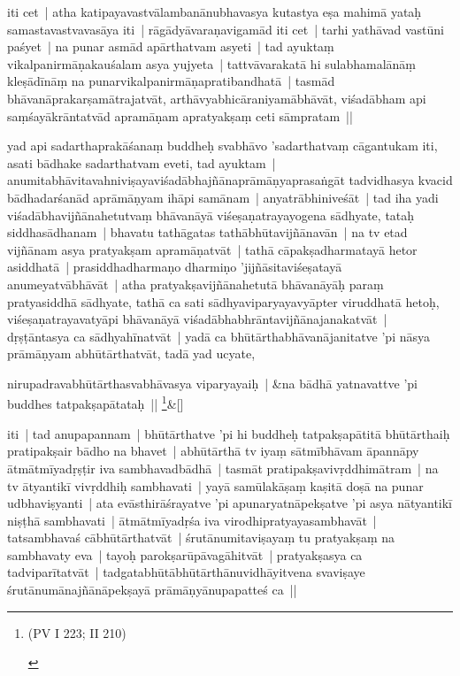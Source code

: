 \documentclass[article,a4paper]{memoir}
\begin{document}
	

	  \pstart iti cet | atha katipayavastvā\-lambanā\-nubhavasya kutastya eṣa mahimā\- yataḥ samastavastvavasā\-ya iti | rā\-gā\-dyā\-varaṇavigamā\-d iti cet | tarhi yathā\-vad vastū\-ni paśyet | na punar asmā\-d apā\-rthatvam asyeti | tad ayuktaṃ vikalpanirmā\-ṇakauśalam asya yujyeta | tattvā\-varakatā\- hi sulabhamalā\-nā\-ṃ kleṣā\-dī\-nā\-ṃ na punarvikalpanirmā\-ṇapratibandhatā\- | tasmā\-d bhā\-vanā\-prakarṣamā\-trajatvā\-t, arthā\-vyabhicā\-raniyamā\-bhā\-vā\-t, viśadā\-bham api saṃśayā\-krā\-ntatvā\-d apramā\-ṇam apratyakṣaṃ ceti sā\-mpratam || 
	\pend
      

	  \pstart yad api sadarthaprakā\-śanaṃ buddheḥ svabhā\-vo 'sadarthatvaṃ cā\-gantukam iti, asati bā\-dhake sadarthatvam eveti, tad ayuktam | anumitabhā\-vitavahniviṣayaviśadā\-bhajñā\-naprā\-mā\-ṇyaprasaṅgā\-t tadvidhasya kvacid bā\-dhadarśanā\-d aprā\-mā\-ṇyam ihā\-pi samā\-nam | anyatrā\-bhiniveśā\-t | tad iha yadi viśadā\-bhavijñā\-nahetutvaṃ bhā\-vanā\-yā\- viśeṣaṇatrayayogena sā\-dhyate, tataḥ siddhasā\-dhanam | bhavatu tathā\-gatas tathā\-bhū\-tavijñā\-navā\-n | na tv etad vijñā\-nam asya pratyakṣam apramā\-ṇatvā\-t | tathā\- cā\-pakṣadharmatayā\- hetor asiddhatā\- | prasiddhadharmaṇo dharmiṇo 'jijñā\-sitaviśeṣatayā\- anumeyatvā\-bhā\-vā\-t | atha pratyakṣavijñā\-nahetutā\- bhā\-vanā\-yā\-ḥ paraṃ pratyasiddhā\- sā\-dhyate, tathā\- ca sati sā\-dhyaviparyayavyā\-pter viruddhatā\- hetoḥ, viśeṣaṇatrayavatyā\-pi bhā\-vanā\-yā\- viśadā\-bhabhrā\-ntavijñā\-najanakatvā\-t | dṛṣṭā\-ntasya ca sā\-dhyahī\-natvā\-t | yadā\- ca bhū\-tā\-rthabhā\-vanā\-janitatve 'pi nā\-sya prā\-mā\-ṇyam abhū\-tā\-rthatvā\-t, tadā\- yad ucyate, 
	\pend
      
	    
	    \stanza[\smallbreak]
nirupadravabhū\-tā\-rthasvabhā\-vasya viparyayaiḥ | &na bā\-dhā\- yatnavattve 'pi buddhes tatpakṣapā\-tataḥ || \footnote{\begin{english}(PV I 223; II 210)\end{english}}\&[\smallbreak]


	

	  \pstart iti | tad anupapannam | bhū\-tā\-rthatve 'pi hi buddheḥ tatpakṣapā\-titā\- bhū\-tā\-rthaiḥ pratipakṣair bā\-dho na bhavet | abhū\-tā\-rthā\- tv iyaṃ sā\-tmī\-bhā\-vam ā\-pannā\-py ā\-tmā\-tmī\-yadṛṣṭir iva sambhavadbā\-dhā\- | tasmā\-t pratipakṣavivṛddhimā\-tram | na tv ā\-tyantikī\- vivṛddhiḥ sambhavati | yayā\- samū\-lakā\-ṣaṃ kaṣitā\- doṣā\- na punar udbhaviṣyanti | ata evā\-sthirā\-śrayatve 'pi apunaryatnā\-pekṣatve 'pi asya nā\-tyantikī\- niṣṭhā\- sambhavati | ā\-tmā\-tmī\-yadṛśa iva virodhipratyayasambhavā\-t | tatsambhavaś cā\-bhū\-tā\-rthatvā\-t | śrutā\-numitaviṣayaṃ tu pratyakṣaṃ na sambhavaty eva | tayoḥ parokṣarū\-pā\-vagā\-hitvā\-t | pratyakṣasya ca tadviparī\-tatvā\-t | tadgatabhū\-tā\-bhū\-tā\-rthā\-nuvidhā\-yitvena svaviṣaye śrutā\-numā\-najñā\-nā\-pekṣayā\- prā\-mā\-ṇyā\-nupapatteś ca || 
	\pend
      
\end{document}
